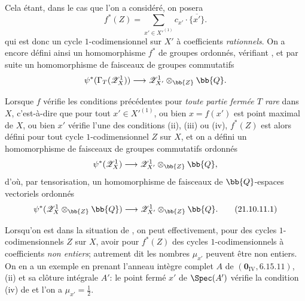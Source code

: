 \begin{env}[21.10.11]
Cela étant, dans le cas que l'on a considéré, on posera
\[
  f^*(Z)=\sum_{x'\in X'^{(1)}}c_{x'}\cdot\overline{\{x'\}}.
\]
qui est donc un cycle $1$-codimensionnel sur $X'$ à coefficients \emph{rationnels}.
On a encore défini ainsi un homomorphisme $f^*$ de groupes ordonnés, vérifiant , et par suite un homomorphisme de faisceaux de groupes commutatifs
\[
  \psi^*(\Gamma_T(\mathscr{Z}^1_X))\to\mathscr{Z}^1_{X'}\otimes_{\bb{Z}}\bb{Q}.
\]

Lorsque $f$ vérifie les conditions précédentes pour \emph{toute partie fermée $T$ rare} dans $X$, c'est-à-dire que pour tout $x'\in X'^{(1)}$, ou bien $x=f(x')$ est point maximal de $X$, ou bien $x'$ vérifie l'une des conditions (ii), (iii) ou (iv), $f^*(Z)$ est alors défini pour tout cycle $1$-codimensionnel $Z$ sur $X$, et on a défini un homomorphisme de faisceaux de groupes commutatifs ordonnés
\[
  \psi^*(\mathscr{Z}^1_X)\to\mathscr{Z}^1_{X'}\otimes_{\bb{Z}}\bb{Q},
\]
d'où, par tensorisation, un homomorphisme de faisceaux de $\bb{Q}$-espaces vectoriels ordonnés
\[
\label{IV.21.10.11.1}
  \psi^*(\mathscr{Z}^1_X\otimes_{\bb{Z}}\bb{Q})\to\mathscr{Z}^1_{X'}\otimes_{\bb{Z}}\bb{Q}.
  \tag{21.10.11.1}
\]
\end{env}

\begin{remark}[21.10.12]
\label{IV.21.10.12}
Lorsqu'on est dans la situation de , on peut effectivement, pour des cycles $1$-codimensionnels $Z$ sur $X$, avoir pour $f^*(Z)$ des cycles $1$-codimensionnels à coefficients \emph{non entiers}; autrement dit les nombres $\mu_{x'}$ peuvent être non entiers.
On en a un exemple en prenant l'anneau intègre complet $A$ de $(\mathbf{0}_{\mathrm{IV}},6.15.11)$, (ii) et sa clôture intégrale $A'$: le point fermé $x'$ de $\Spec(A')$ vérifie la condition (iv) de  et l'on a $\mu_{x'}=\frac12$.
\end{remark}

